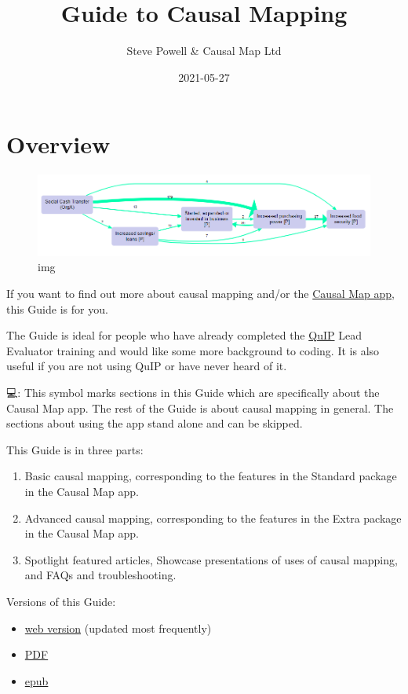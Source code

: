 \documentclass[
]{book}
\title{Guide to Causal Mapping}
\author{Steve Powell \& Causal Map Ltd}
\date{2021-05-27}
\providecommand{\tightlist}{%
  \setlength{\itemsep}{0pt}\setlength{\parskip}{0pt}}
\begin{document}
\maketitle

{
\setcounter{tocdepth}{1}
\tableofcontents
}
\hypertarget{overview}{%
\chapter{Overview}\label{overview}}

\begin{figure}
\centering
\includegraphics{_assets/simplify.png}
\caption{img}
\end{figure}

If you want to find out more about causal mapping and/or the \href{https://causalmap.app}{Causal Map app}, this Guide is for you.

The Guide is ideal for people who have already completed the \href{https://bathsdr.org/about-the-quip/}{QuIP} Lead Evaluator training and would like some more background to coding. It is also useful if you are not using QuIP or have never heard of it.

💻: This symbol marks sections in this Guide which are specifically about the Causal Map app. The rest of the Guide is about causal mapping in general. The sections about using the app stand alone and can be skipped.

This Guide is in three parts:

\begin{enumerate}
\def\labelenumi{\arabic{enumi})}
\item
  Basic causal mapping, corresponding to the features in the Standard package in the Causal Map app.
\item
  Advanced causal mapping, corresponding to the features in the Extra package in the Causal Map app.
\item
  Spotlight featured articles, Showcase presentations of uses of causal mapping, and FAQs and troubleshooting.
\end{enumerate}

Versions of this Guide:

\begin{itemize}
\tightlist
\item
  \href{https://guide.causalmap.app/}{web version} (updated most frequently)
\item
  \href{https://guide.causalmap.app/Guide-to-causal-mapping.pdf}{PDF}
\item
  \href{https://guide.causalmap.app/Guide-to-causal-mapping.epub}{epub}
\end{itemize}
\end{document}

